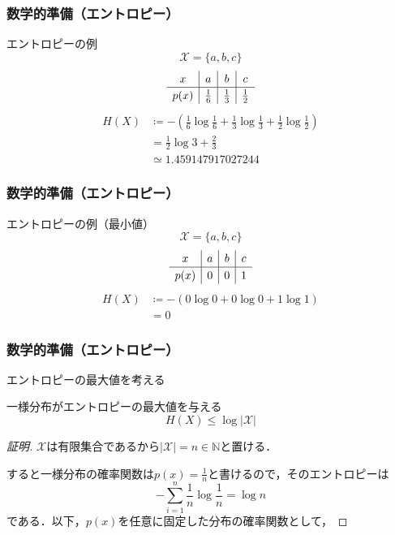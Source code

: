 \documentclass{classes/myslide}
\begin{document}
\begin{frame}\frametitle{数学的準備（エントロピー）}
  \begin{exampleblock}{エントロピーの例}
    \[ \mathcal{X} = \{a, b, c\} \]
    \[
      \begingroup
      \renewcommand{\arraystretch}{1.2}
        \begin{array}{c|c|c|c}
          x & a & b & c \\ \hline
          p(x) & \frac{1}{6} & \frac{1}{3} & \frac{1}{2}
        \end{array}
      \endgroup
    \]
    \begin{align*}
      H(X)
      &\coloneq - \left( \frac{1}{6} \log \frac{1}{6} + \frac{1}{3} \log \frac{1}{3} + \frac{1}{2} \log \frac{1}{2}\right) \\
      &= \frac{1}{2}\log 3 + \frac{2}{3} \\
      &\simeq 1.459147917027244
    \end{align*}
  \end{exampleblock}
\end{frame}

\begin{frame}\frametitle{数学的準備（エントロピー）}
  \begin{exampleblock}{エントロピーの例（最小値）}
    \[ \mathcal{X} = \{a, b, c\} \]
    \[
      \begingroup
      \renewcommand{\arraystretch}{1.2}
        \begin{array}{c|c|c|c}
          x & a & b & c \\ \hline
          p(x) & 0 & 0 & 1
        \end{array}
      \endgroup
    \]
    \begin{align*}
      H(X)
      &\coloneq -(0 \log 0 + 0 \log 0 + 1 \log 1) \\
      &= 0
    \end{align*}
  \end{exampleblock}
\end{frame}

\begin{frame}\frametitle{数学的準備（エントロピー）}
  エントロピーの最大値を考える
  \begin{theorem}[エントロピーの最大値]
    一様分布がエントロピーの最大値を与える
    \[H(X) \leq \log |\mathcal{X}| \]
  \end{theorem}
  \begin{proof}[証明]
    $\mathcal{X}$は有限集合であるから$|\mathcal{X}| = n \in \mathbb{N}$と置ける．

    すると一様分布の確率関数は$p(x) = \frac{1}{n}$と書けるので，そのエントロピーは
      \[ - \sum_{i = 1}^{n} \frac{1}{n} \log \frac{1}{n} = \log n \]
    である．以下，$p(x)$を任意に固定した分布の確率関数として，
    \let\qedsymbol\relax
  \end{proof}
\end{frame}
\end{document}
